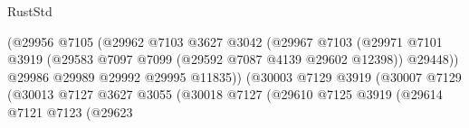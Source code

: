 \begin{lexlean}{RustStd}
\begin{coremodule}
                                                      (@29956
                                                        @7105
                                                        (@29962
                                                          @7103
                                                          @3627
                                                          @3042
                                                          (@29967
                                                            @7103
                                                            (@29971
                                                              @7101
                                                              @3919
                                                              (@29583
                                                                @7097
                                                                @7099
                                                                (@29592 @7087 @4139 @29602 @12398))
                                                              @29448))
                                                          @29986
                                                          @29989
                                                          @29992
                                                          @29995
                                                          @11835))
                                                      (@30003
                                                        @7129
                                                        @3919
                                                        (@30007
                                                          @7129
                                                          (@30013
                                                            @7127
                                                            @3627
                                                            @3055
                                                            (@30018
                                                              @7127
                                                              (@29610
                                                                @7125
                                                                @3919
                                                                (@29614
                                                                  @7121
                                                                  @7123
                                                                  (@29623

\end{coremodule}
\end{lexlean}
